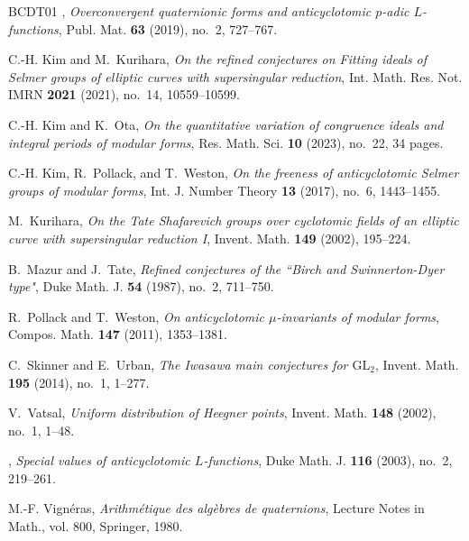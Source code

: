 \documentclass[11pt]{amsart}
\numberwithin{equation}{section}
\theoremstyle{definition}
\begin{document}
\begin{thebibliography}{BCDT01}
\bysame, \emph{Overconvergent quaternionic forms and anticyclotomic {$p$}-adic
  {$L$}-functions}, Publ. Mat. \textbf{63} (2019), no.~2, 727--767.

C.-H. Kim and M.~Kurihara, \emph{On the refined conjectures on {F}itting ideals
  of {S}elmer groups of elliptic curves with supersingular reduction}, Int.
  Math. Res. Not. IMRN \textbf{2021} (2021), no.~14, 10559--10599.

C.-H. Kim and K.~Ota, \emph{On the quantitative variation of congruence ideals
  and integral periods of modular forms}, Res. Math. Sci. \textbf{10} (2023),
  no.~22, 34 pages.

C.-H. Kim, R.~Pollack, and T.~Weston, \emph{On the freeness of anticyclotomic
  {S}elmer groups of modular forms}, Int. J. Number Theory \textbf{13} (2017),
  no.~6, 1443--1455.

M.~Kurihara, \emph{On the {T}ate {S}hafarevich groups over cyclotomic fields of
  an elliptic curve with supersingular reduction {I}}, Invent. Math.
  \textbf{149} (2002), 195--224.

B.~Mazur and J.~Tate, \emph{Refined conjectures of the ``{B}irch and
  {S}winnerton-{D}yer type"}, Duke Math. J. \textbf{54} (1987), no.~2,
  711--750.

R.~Pollack and T.~Weston, \emph{On anticyclotomic {$\mu$}-invariants of modular
  forms}, Compos. Math. \textbf{147} (2011), 1353--1381.

C.~Skinner and E.~Urban, \emph{The {I}wasawa main conjectures for
  {$\mathrm{GL}_2$}}, Invent. Math. \textbf{195} (2014), no.~1, 1--277.

V.~Vatsal, \emph{Uniform distribution of {H}eegner points}, Invent. Math.
  \textbf{148} (2002), no.~1, 1--48.

\bysame, \emph{Special values of anticyclotomic {$L$}-functions}, Duke Math. J.
  \textbf{116} (2003), no.~2, 219--261.

M.-{F}. Vign\'{e}ras, \emph{Arithm\'{e}tique des alg\`{e}bres de quaternions},
  Lecture Notes in Math., vol. 800, Springer, 1980.

\end{thebibliography}
\end{document}

